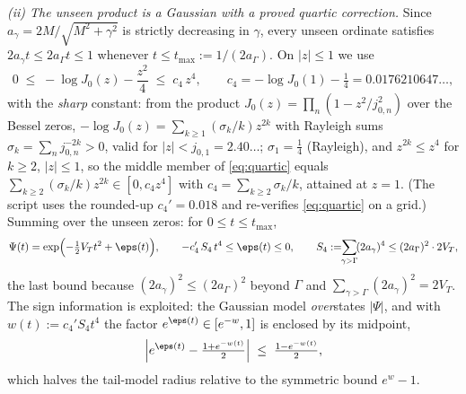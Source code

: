 \emph{(ii) The unseen product is a Gaussian with a proved quartic
correction.} Since $a_\gamma=2M/\sqrt{M^2+\gamma^2}$ is strictly
decreasing in $\gamma$, every unseen ordinate satisfies
$2a_\gamma t\le 2a_\Gamma t\le1$ whenever
$t\le t_{\max}:=1/(2a_\Gamma)$. On $|z|\le1$ we use
\begin{equation}\label{eq:quartic}
0\;\le\;-\log J_0(z)-\frac{z^2}{4}\;\le\;c_4\,z^4,
\qquad
c_4=-\log J_0(1)-\tfrac14=0.0176210647\ldots,
\end{equation}
with the \emph{sharp} constant: from the product
$J_0(z)=\prod_n(1-z^2/j_{0,n}^2)$ over the Bessel zeros,
$-\log J_0(z)=\sum_{k\ge1}(\sigma_k/k)z^{2k}$ with Rayleigh sums
$\sigma_k=\sum_nj_{0,n}^{-2k}>0$, valid for $|z|<j_{0,1}=2.40\ldots$;
$\sigma_1=\tfrac14$ (Rayleigh), and $z^{2k}\le z^4$ for $k\ge2$,
$|z|\le1$, so the middle member of \eqref{eq:quartic} equals
$\sum_{k\ge2}(\sigma_k/k)z^{2k}\in[0,c_4z^4]$ with
$c_4=\sum_{k\ge2}\sigma_k/k$, attained at $z=1$. (The script uses the
rounded-up $c_4'=0.018$ and re-verifies \eqref{eq:quartic} on a grid.)
Summing over the unseen zeros: for $0\le t\le t_{\max}$,
\[
\Psi(t)=\exp\Bigl(-\tfrac12V_Tt^2+\eps(t)\Bigr),
\qquad
-c_4'\,S_4\,t^4\le\eps(t)\le0,
\qquad
S_4:=\!\!\sum_{\gamma>\Gamma}\!(2a_\gamma)^4
\le(2a_\Gamma)^2\cdot 2V_T,
\]
the last bound because $(2a_\gamma)^2\le(2a_\Gamma)^2$ beyond $\Gamma$
and $\sum_{\gamma>\Gamma}(2a_\gamma)^2=2V_T$. The sign information is
exploited: the Gaussian model \emph{over}states $|\Psi|$, and with
$w(t):=c_4'S_4t^4$ the factor $e^{\eps(t)}\in[e^{-w},1]$ is enclosed by
its midpoint,
\[
\Bigl|e^{\eps(t)}-\tfrac{1+e^{-w(t)}}2\Bigr|\;\le\;\tfrac{1-e^{-w(t)}}2,
\]
which halves the tail-model radius relative to the symmetric bound
$e^{w}-1$.

